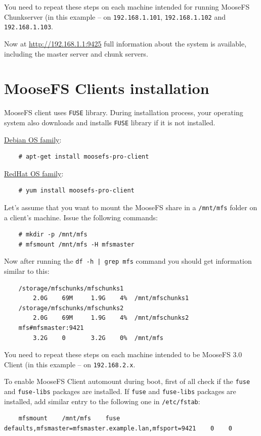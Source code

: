 \documentclass[a4paper,11pt,english]{report}
\def\code#1{\texttt{#1}}
\begin{document}
		
		\bigskip
		\bigskip
		You need to repeat these steps on each machine intended for running MooseFS Chunkserver (in this example -- on \code{192.168.1.101}, \code{192.168.1.102} and \code{192.168.1.103}.
		
		Now at \url{http://192.168.1.1:9425} full information about the system is available, including the master server and chunk servers.
		
		
		\section{MooseFS Clients installation}
		MooseFS client uses \code{FUSE} library. During installation process, your operating system also downloads and installs \code{FUSE} library if it is not installed.

		\underline{Debian OS family}:
		\begin{lstlisting}
	# apt-get install moosefs-pro-client
		\end{lstlisting}

		\underline{RedHat OS family}:
		\begin{lstlisting}
	# yum install moosefs-pro-client
		\end{lstlisting}

		Let's assume that you want to mount the MooseFS share in a \code{/mnt/mfs} folder on a client's machine. Issue the following commands:
		\begin{lstlisting}
	# mkdir -p /mnt/mfs
	# mfsmount /mnt/mfs -H mfsmaster
		\end{lstlisting}

		Now after running the \code{df -h | grep mfs} command you should get information similar to this:
		\begin{lstlisting}
	/storage/mfschunks/mfschunks1
		2.0G	69M		1.9G	4%	/mnt/mfschunks1
	/storage/mfschunks/mfschunks2
		2.0G	69M		1.9G	4%	/mnt/mfschunks2
	mfs#mfsmaster:9421
		3.2G	0		3.2G	0%	/mnt/mfs
		\end{lstlisting}
		
		You need to repeat these steps on each machine intended to be MooseFS 3.0 Client (in this example -- on \code{192.168.2.x}.
		
		To enable MooseFS Client automount during boot, first of all check if the \code{fuse} and \code{fuse-libs} packages are installed. If \code{fuse} and \code{fuse-libs} packages are installed, add similar entry to the following one in \code{/etc/fstab}:

		\begin{lstlisting}
	mfsmount    /mnt/mfs    fuse    defaults,mfsmaster=mfsmaster.example.lan,mfsport=9421    0    0 
		\end{lstlisting}
		
\end{document}
